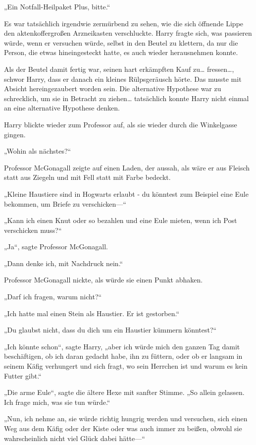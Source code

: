 {„Ein Notfall-Heilpaket Plus, bitte.“

Es war tatsächlich irgendwie zermürbend zu sehen, wie die sich öffnende Lippe den aktenkoffergroßen Arzneikasten verschluckte. Harry fragte sich, was passieren würde, wenn er versuchen würde, selbst in den Beutel zu klettern, da nur die Person, die etwas hineingesteckt hatte, es auch wieder herausnehmen konnte.

Als der Beutel damit fertig war, seinen hart erkämpften Kauf zu… fressen…, schwor Harry, dass er danach ein kleines Rülpsgeräusch hörte. Das musste mit Absicht hereingezaubert worden sein. Die alternative Hypothese war zu schrecklich, um sie in Betracht zu ziehen… tatsächlich konnte Harry nicht einmal an eine alternative Hypothese denken.

Harry blickte wieder zum Professor auf, als sie wieder durch die Winkelgasse gingen.

„Wohin als nächstes?“

Professor McGonagall zeigte auf einen Laden, der aussah, als wäre er aus Fleisch statt aus Ziegeln und mit Fell statt mit Farbe bedeckt.

„Kleine Haustiere sind in Hogwarts erlaubt - du könntest zum Beispiel eine Eule bekommen, um Briefe zu verschicken—“

„Kann ich einen Knut oder so bezahlen und eine Eule mieten, wenn ich Post verschicken muss?“

„Ja“, sagte Professor McGonagall.

„Dann denke ich, mit Nachdruck nein.“

Professor McGonagall nickte, als würde sie einen Punkt abhaken.

„Darf ich fragen, warum nicht?“

„Ich hatte mal einen Stein als Haustier. Er ist gestorben.“

„Du glaubst nicht, dass du dich um ein Haustier kümmern könntest?“

„Ich könnte schon“, sagte Harry, „aber ich würde mich den ganzen Tag damit beschäftigen, ob ich daran gedacht habe, ihn zu füttern, oder ob er langsam in seinem Käfig verhungert und sich fragt, wo sein Herrchen ist und warum es kein Futter gibt.“

„Die arme Eule“, sagte die ältere Hexe mit sanfter Stimme. „So allein gelassen. Ich frage mich, was sie tun würde.“

„Nun, ich nehme an, sie würde richtig hungrig werden und versuchen, sich einen Weg aus dem Käfig oder der Kiste oder was auch immer zu beißen, obwohl sie wahrscheinlich nicht viel Glück dabei hätte—“

}
